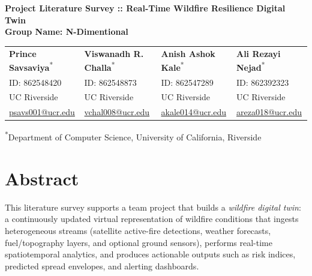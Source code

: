 \documentclass[acmsmall,screen,nonacm]{acmart}
\begin{document}
\begin{center}
    {\Huge \textbf{Project Literature Survey :: Real-Time Wildfire Resilience Digital Twin}} \\
    \vspace{0.5em}
    {\Large \textbf{Group Name: N-Dimentional}} \\
    \vspace{2em}

    \hspace*{-1.5cm} 
    \begin{tabular}{ >{\centering\arraybackslash}p{3.8cm} >{\centering\arraybackslash}p{3.8cm} >{\centering\arraybackslash}p{3.8cm} >{\centering\arraybackslash}p{3.8cm} }
        
        \textbf{Prince Savsaviya}\textsuperscript{*} & \textbf{Viswanadh R. Challa}\textsuperscript{*} & \textbf{Anish Ashok Kale}\textsuperscript{*} & \textbf{Ali Rezayi Nejad}\textsuperscript{*} \\
        
        \small ID: 862548420 & \small ID: 862548873 & \small ID: 862547289 & \small ID: 862392323 \\
        
        \small UC Riverside & \small UC Riverside & \small UC Riverside & \small UC Riverside \\
        
        \small \href{mailto:psavs001@ucr.edu}{psavs001@ucr.edu} & 
        \small \href{mailto:vchal008@ucr.edu}{vchal008@ucr.edu} & 
        \small \href{mailto:akale014@ucr.edu}{akale014@ucr.edu} & 
        \small \href{mailto:areza018@ucr.edu}{areza018@ucr.edu} \\
        
    \end{tabular}
    
    \vspace{1em}
    {\footnotesize \textsuperscript{*}Department of Computer Science, University of California, Riverside}
    \vspace{2em}
\end{center}

\date{February 19, 2026}


\section*{Abstract}
This literature survey supports a team project that builds a \emph{wildfire digital twin}: a continuously
updated virtual representation of wildfire conditions that ingests heterogeneous streams (satellite active-fire
detections, weather forecasts, fuel/topography layers, and optional ground sensors), performs real-time
spatiotemporal analytics, and produces actionable outputs such as risk indices, predicted spread envelopes,
and alerting dashboards.
\end{document}
